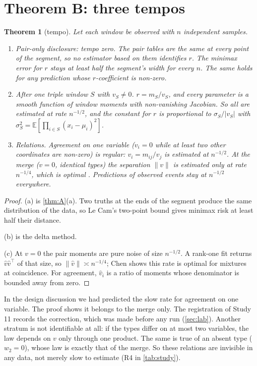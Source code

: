 \documentclass[11pt]{article}
\newtheorem{theorem}{Theorem}\renewcommand{\thetheorem}{\Alph{theorem}}
\theoremstyle{definition}\newtheorem{definition}{Definition}\newtheorem{remark}{Remark}
\begin{document}
\section{Theorem B: three tempos}\label{sec:B}
\begin{theorem}[tempo]\label{thm:B}
Let each window be observed with $n$ independent samples.
\begin{enumerate}
\item[(a)] \emph{Pair-only disclosure: tempo zero.} The pair tables are the same at every point of the segment, so no estimator based
on them identifies $r$. The minimax error for $r$ stays at least half the segment's width for every $n$. The same holds for any
prediction whose $r$-coefficient is non-zero.
\item[(b)] \emph{After one triple window $S$ with $v_S\ne0$.} $r=m_S/v_S$, and every parameter is a smooth function of window
moments with non-vanishing Jacobian. So all are estimated at rate $n^{-1/2}$, and the constant for $r$ is proportional to
$\sigma_S/|v_S|$ with $\sigma_S^2=\mathbb E[\prod_{i\in S}(x_i-\mu_i)^2]$.
\item[(c)] \emph{Relations.} Agreement on one variable ($v_i=0$ while at least two other coordinates are non-zero) is regular:
$v_i=m_{ij}/v_j$ is estimated at $n^{-1/2}$. At the merge ($v=0$, identical types) the separation $\|v\|$ is estimated only at rate
$n^{-1/4}$, which is optimal \cite{Chen1995}. Predictions of observed events stay at $n^{-1/2}$ everywhere.
\end{enumerate}
\end{theorem}

\begin{proof}
(a) is \cref{thm:A}(a). Two truths at the ends of the segment produce the same distribution of the data, so Le Cam's two-point bound
gives minimax risk at least half their distance.

(b) is the delta method.

(c) At $v=0$ the pair moments are pure noise of size $n^{-1/2}$. A rank-one fit returns $\hat v\hat v^\top$ of that size, so
$\|\hat v\|\asymp n^{-1/4}$; Chen \cite{Chen1995} shows this rate is optimal for mixtures at coincidence. For agreement, $\hat v_i$ is a
ratio of moments whose denominator is bounded away from zero.
\end{proof}

In the design discussion we had predicted the slow rate for agreement on one variable. The proof shows it belongs to the merge only.
The registration of Study 11 records the correction, which was made before any run (\cref{sec:lab}). Another stratum is not
identifiable at all: if the types differ on at most two variables, the law depends on $v$ only through one product. The same is true
of an absent type ($w_2=0$), whose law is exactly that of the merge. So these relations are invisible in any data, not merely slow to
estimate (R4 in \cref{tab:study}).
\end{document}
